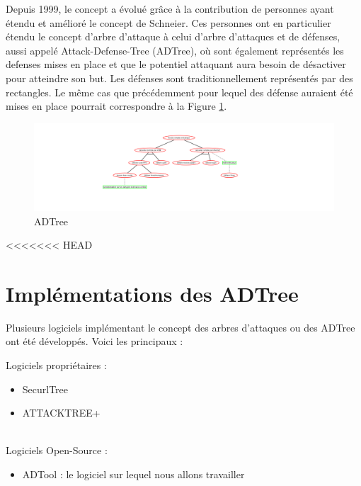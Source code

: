 		Depuis 1999, le concept a évolué grâce à la contribution de personnes ayant étendu et amélioré le concept de Schneier. Ces personnes ont en particulier étendu le concept d'arbre d'attaque à celui d'arbre d'attaques et de défenses, aussi appelé Attack-Defense-Tree (ADTree), où sont également représentés les defenses mises en place et que le potentiel attaquant aura besoin de désactiver pour atteindre son but. Les défenses sont traditionnellement représentés par des rectangles. Le même cas que précédemment pour lequel des défense auraient été mises en place pourrait correspondre à la Figure \ref{fig:arbre_exemple_2}.

        \begin{figure}[h!]
            \begin{center}
                \includegraphics[width=1\textwidth]{figure/exemple2_rapport.png}
            \end{center}
            \caption{ADTree}
            \label{fig:arbre_exemple_2}
        \end{figure}

<<<<<<< HEAD
	\section{Implémentations des ADTree}
		Plusieurs logiciels implémentant le concept des arbres d'attaques ou des ADTree ont été développés. Voici les principaux :
        
        {\large Logiciels propriétaires :}
        \begin{itemize}
            \item SecurlTree
            \item ATTACKTREE+
        \end{itemize}
        ~~\\
        {\large Logiciels Open-Source :}
        \begin{itemize}
            \item ADTool : le logiciel sur lequel nous allons travailler
        \end{itemize}
~~

